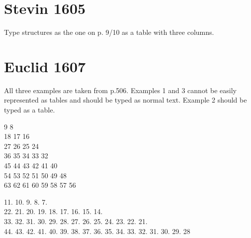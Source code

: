\documentclass[fontsize=11pt, paper=a4, 
DIV15,
normalheadings,
parskip=half-, 
pointlessnumbers]{scrartcl}
\begin{document}
\section{Stevin 1605}

\begin{mainrule}
Type structures as the one on p. 9/10 as a table with three columns.
\end{mainrule}

\section{Euclid 1607}

All three examples are taken from p.506. Examples 1 and 3 cannot be easily represented as tables and should be typed as normal text. Example 2 should be typed as a table.

\begin{example}[1]

\begin{typeLatin}
9 8 \\
18 17 16 \\
27 26 25 24 \\
36 35 34 33 32 \\
45 44 43 42 41 40 \\
54 53 52 51 50 49 48 \\
63 62 61 60 59 58 57 56 \\
\end{typeLatin}

\end{example}

\begin{example}[2]


\end{example}

\begin{example}[3]

\begin{typeLatin}
11. 10. 9. 8. 7.  \\
22. 21. 20. 19. 18. 17. 16. 15. 14.  \\
33. 32. 31. 30. 29. 28. 27. 26. 25. 24. 23. 22. 21.  \\
44. 43. 42. 41. 40. 39. 38. 37. 36. 35. 34. 33. 32. 31. 30. 29. 28  \\
\end{typeLatin}

\end{example}

\end{document}
